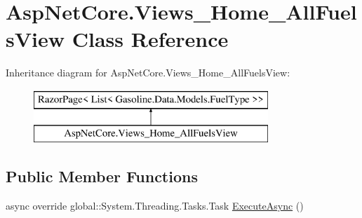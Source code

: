 \hypertarget{class_asp_net_core_1_1_views___home___all_fuels_view}{}\section{Asp\+Net\+Core.\+Views\+\_\+\+Home\+\_\+\+All\+Fuels\+View Class Reference}
\label{class_asp_net_core_1_1_views___home___all_fuels_view}
Inheritance diagram for Asp\+Net\+Core.\+Views\+\_\+\+Home\+\_\+\+All\+Fuels\+View\+:\begin{figure}[H]
\begin{center}
\leavevmode
\includegraphics[height=2.000000cm]{class_asp_net_core_1_1_views___home___all_fuels_view}
\end{center}
\end{figure}
\subsection*{Public Member Functions}
\begin{DoxyCompactItemize}
\item 
async override global\+::\+System.\+Threading.\+Tasks.\+Task \mbox{\hyperlink{class_asp_net_core_1_1_views___home___all_fuels_view_a2f1c791398d0456876e91246e6e4e71a}{Execute\+Async}} ()
\end{DoxyCompactItemize}
